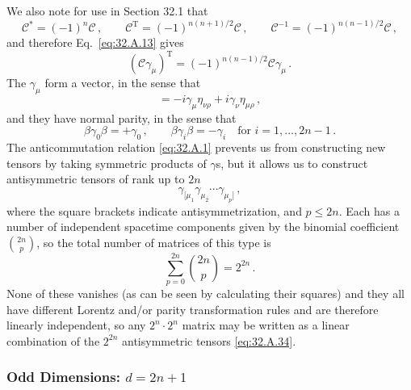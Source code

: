 We also note for use in Section 32.1 that
\begin{equation}
  \mathcal C^*=(-1)^n\mathcal C\,,
  \qquad
  \mathcal C^{\mathrm T}=(-1)^{n(n+1)/2}\mathcal C\,,
  \qquad
  \mathcal C^{-1}=(-1)^{n(n-1)/2}\mathcal C\,,
  \tag{32.A.30}\label{eq:32.A.30}
\end{equation}
and therefore Eq.~\eqref{eq:32.A.13} gives
\begin{equation}
  (\mathcal C\gamma_\mu)^{\mathrm T}
  =(-1)^{n(n-1)/2}\mathcal C\gamma_\mu\,.
  \tag{32.A.31}\label{eq:32.A.31}
\end{equation}
The \(\gamma_\mu\) form a vector, in the sense that
\begin{equation}
  [\mathcal J_{\mu\nu},\gamma_\rho]
  =-i\gamma_\mu\eta_{\nu\rho}
   +i\gamma_\nu\eta_{\mu\rho}\,,
  \tag{32.A.32}\label{eq:32.A.32}
\end{equation}
and they have normal parity, in the sense that
\begin{equation}
  \beta\gamma_0\beta=+\gamma_0\,,
  \qquad
  \beta\gamma_i\beta=-\gamma_i
  \quad\text{for \(i=1,\ldots,2n-1\)}\,.
  \tag{32.A.33}\label{eq:32.A.33}
\end{equation}
The anticommutation relation \eqref{eq:32.A.1} prevents us from constructing
new tensors by taking symmetric products of \(\gamma\)s, but it allows us
to construct antisymmetric tensors of rank up to \(2n\)
\begin{equation}
  \gamma_{[\mu_1}\gamma_{\mu_2}\cdots\gamma_{\mu_p]}\,,
  \tag{32.A.34}\label{eq:32.A.34}
\end{equation}
where the square brackets indicate antisymmetrization, and \(p\le 2n\).
Each has a number of independent spacetime components given by the binomial
coefficient \(\binom{2n}{p}\), so the total number of matrices of this type
is
\begin{equation}
  \sum_{p=0}^{2n}\binom{2n}{p}=2^{2n}\,.
  \tag{32.A.35}\label{eq:32.A.35}
\end{equation}
None of these vanishes (as can be seen by calculating their squares) and
they all have different Lorentz and/or parity transformation rules and are
therefore linearly independent, so any \(2^n\cdot2^n\) matrix may be written
as a linear combination of the \(2^{2n}\) antisymmetric tensors
\eqref{eq:32.A.34}.

\subsubsection*{Odd Dimensions: \(d=2n+1\)}

